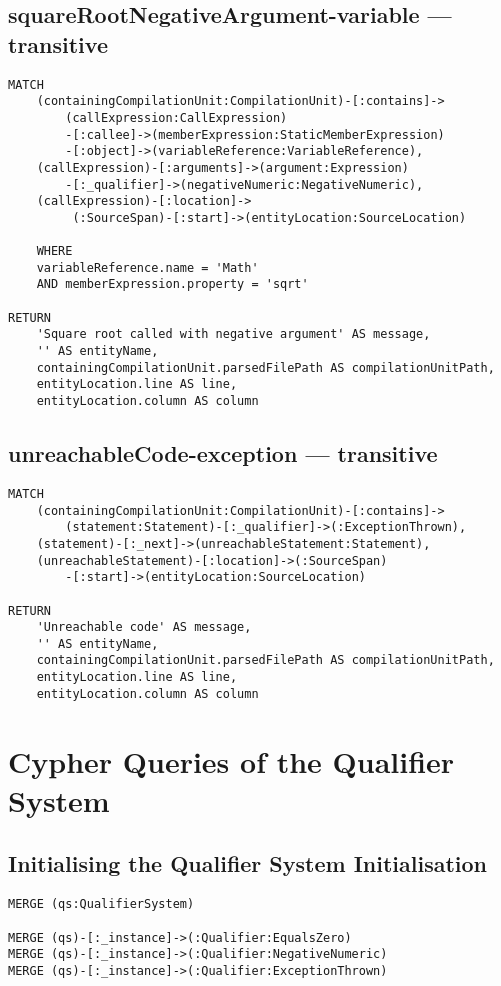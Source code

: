 \newpage
\subsection{squareRootNegativeArgument-variable — transitive}
\begin{lstlisting}[language=Cypher]
MATCH
    (containingCompilationUnit:CompilationUnit)-[:contains]->
        (callExpression:CallExpression)
        -[:callee]->(memberExpression:StaticMemberExpression)
        -[:object]->(variableReference:VariableReference),
    (callExpression)-[:arguments]->(argument:Expression)
        -[:_qualifier]->(negativeNumeric:NegativeNumeric),
    (callExpression)-[:location]->
         (:SourceSpan)-[:start]->(entityLocation:SourceLocation)

    WHERE
    variableReference.name = 'Math'
    AND memberExpression.property = 'sqrt'

RETURN
    'Square root called with negative argument' AS message,
    '' AS entityName,
    containingCompilationUnit.parsedFilePath AS compilationUnitPath,
    entityLocation.line AS line,
    entityLocation.column AS column
\end{lstlisting}


\newpage
\subsection{unreachableCode-exception — transitive}
\begin{lstlisting}[language=Cypher]
MATCH
    (containingCompilationUnit:CompilationUnit)-[:contains]->
        (statement:Statement)-[:_qualifier]->(:ExceptionThrown),
    (statement)-[:_next]->(unreachableStatement:Statement),
    (unreachableStatement)-[:location]->(:SourceSpan)
        -[:start]->(entityLocation:SourceLocation)

RETURN
    'Unreachable code' AS message,
    '' AS entityName,
    containingCompilationUnit.parsedFilePath AS compilationUnitPath,
    entityLocation.line AS line,
    entityLocation.column AS column
\end{lstlisting}


\newpage
\section{Cypher Queries of the Qualifier System}

\subsection{Initialising the Qualifier System Initialisation}
\begin{lstlisting}[language=Cypher]
MERGE (qs:QualifierSystem)

MERGE (qs)-[:_instance]->(:Qualifier:EqualsZero)
MERGE (qs)-[:_instance]->(:Qualifier:NegativeNumeric)
MERGE (qs)-[:_instance]->(:Qualifier:ExceptionThrown)
\end{lstlisting}


